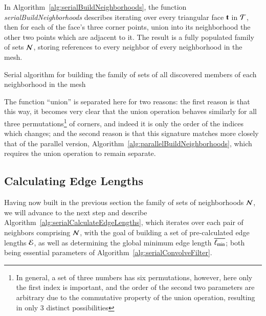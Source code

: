In Algorithm~\ref{alg:serialBuildNeighborhoods}, the function \textit{serialBuildNeighborhoods} describes iterating over every triangular face $\mathbf{t}$ in $\mathcal{T}$, then for each of the face's three corner points, union into its neighborhood the other two points which are adjacent to it. The result is a fully populated family of sets $\mathcal{N}$, storing references to every neighbor of every neighborhood in the mesh.

\begin{algorithm}[ht]
	\DontPrintSemicolon


	\bigskip
\nl	{}

	\bigskip
\nl	{}
	\caption{Serial algorithm for building the family of sets of all discovered members of each neighborhood in the mesh\label{alg:serialBuildNeighborhoods}}
\end{algorithm}%

The function ``union'' is separated here for two reasons: the first reason is that this way, it becomes very clear that the union operation behaves similarly for all three permutations\footnote{In general, a set of three numbers has six permutations, however, here only the first index is important, and the order of the second two parameters are arbitrary due to the commutative property of the union operation, resulting in only 3 distinct possibilities} of corners, and indeed it is only the order of the indices which changes; and the second reason is that this signature matches more closely that of the parallel version, Algorithm~\ref{alg:parallelBuildNeighborhoods}, which requires the union operation to remain separate.

%
%
\subsection{Calculating Edge Lengths}
\label{ch5sSIssCEL}
Having now built in the previous section the family of sets of neighborhoods $\mathcal{N}$, we will advance to the next step and describe Algorithm~\ref{alg:serialCalculateEdgeLengths}, which iterates over each pair of neighbors comprising $\mathcal{N}$, with the goal of building a set of pre-calculated edge lengths $\mathcal{E}$, as well as determining the global minimum edge length $\overline{\ell_\text{min}}$; both being essential parameters of Algorithm~\ref{alg:serialConvolveFilter}.

